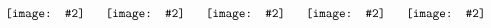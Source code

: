 \newcommand{\xlogo}[2]{\raisebox{-0.5\height}{~\texttt{[image: \#2]}}~}
\begin{equation*}
\begin{array}{ccccccc}
  \xlogo{2.4}{cihr}  &
  \xlogo{2.4}{nserc} &
  \xlogo{1.7}{map}   &
  \xlogo{2.2}{smh}   &
  \xlogo{2.4}{uoft}
\end{array}
\end{equation*}